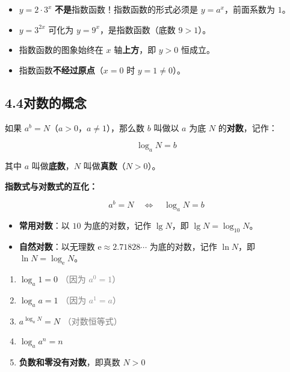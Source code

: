 \documentclass[12pt, a4paper]{ctexart}
\begin{document}
\begin{warnbox}[易错提醒]
\begin{itemize}[leftmargin=2em]
  \item $y=2\cdot 3^x$ \textbf{不是}指数函数！指数函数的形式必须是 $y=a^x$，前面系数为 $1$。
  \item $y=3^{2x}$ 可化为 $y=9^x$，是指数函数（底数 $9>1$）。
  \item 指数函数的图象始终在 $x$ 轴\textbf{上方}，即 $y>0$ 恒成立。
  \item 指数函数\textbf{不经过原点}（$x=0$ 时 $y=1\neq 0$）。
\end{itemize}
\end{warnbox}

\subsection*{4.4\quad 对数的概念}

\begin{knowledgebox}[对数的定义]
如果 $a^b = N$（$a>0$，$a\neq 1$），那么数 $b$ 叫做以 $a$ 为底 $N$ 的\textbf{对数}，记作：

\[
\boxed{\log_a N = b}
\]

其中 $a$ 叫做\textbf{底数}，$N$ 叫做\textbf{真数}（$N>0$）。

\vspace{4pt}
\textbf{指数式与对数式的互化：}

\[
a^b = N \quad \Longleftrightarrow \quad \log_a N = b
\]
\end{knowledgebox}

\begin{knowledgebox}[两种常用对数]
\begin{itemize}[leftmargin=2em]
  \item \textbf{常用对数}：以 $10$ 为底的对数，记作 $\lg N$，即 $\lg N = \log_{10} N$。
  \item \textbf{自然对数}：以无理数 $\mathrm{e}\approx 2.71828\cdots$ 为底的对数，记作 $\ln N$，即 $\ln N = \log_{\mathrm{e}} N$。
\end{itemize}
\end{knowledgebox}

\begin{knowledgebox}[对数的基本性质]
\begin{enumerate}[leftmargin=2em]
  \item $\log_a 1 = 0$ \quad \textcolor{gray}{（因为 $a^0=1$）}
  \item $\log_a a = 1$ \quad \textcolor{gray}{（因为 $a^1=a$）}
  \item $a^{\log_a N} = N$ \quad \textcolor{gray}{（对数恒等式）}
  \item $\log_a a^n = n$
  \item \textbf{负数和零没有对数}，即真数 $N>0$
\end{enumerate}
\end{knowledgebox}
\end{document}
